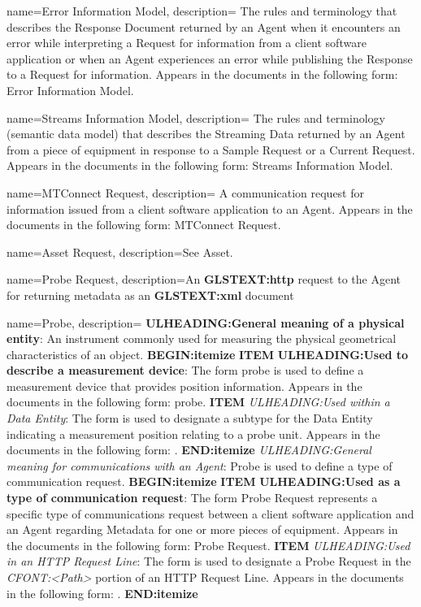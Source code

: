 {
    name={Error Information Model},
	description={
	The rules and terminology that describes the \gls{Response Document} returned by an \gls{Agent} when it encounters an error while interpreting a \gls{Request} for information from a client software application or when an \gls{Agent} experiences an error while publishing the \gls{Response} to a \gls{Request} for information.
	Appears in the documents in the following form: \gls{Error Information Model}.
}
}

{
    name={Streams Information Model},
	description={
	The rules and terminology (\gls{semantic data model}) that describes the \gls{Streaming Data} returned by an \gls{Agent} from a piece of equipment in response to a \gls{Sample Request} or a \gls{Current Request}.
	Appears in the documents in the following form: \gls{Streams Information Model}.
}
}

{
    name={MTConnect Request},
	description={
	A communication request for information issued from a client software application to an \gls{Agent}.
	Appears in the documents in the following form: \gls{MTConnect Request}.
}
}

{
    name={Asset Request},
	description={See \gls{Asset}.}
}

{
    name={Probe Request},
	description={An \textbf{GLSTEXT:http} request to the \gls{Agent} for returning metadata as an  \textbf{GLSTEXT:xml} document}
}

{
    name={Probe},
	description={
	\textbf{ULHEADING:General meaning of a physical entity}:
	An instrument commonly used for measuring the physical geometrical characteristics of an object.
    \textbf{BEGIN:itemize}
	\textbf{ITEM} \textbf{ULHEADING:Used to describe a measurement device}:
	The form probe is used to define a measurement device that provides position information.
	Appears in the documents in the following form: probe. 
	\textbf{ITEM} \textit{ULHEADING:Used within a \gls{Data Entity}}:
	The form  is used to designate a subtype for the \gls{Data Entity}  indicating a measurement position relating to a probe unit.
	Appears in the documents in the following form: .
    \textbf{END:itemize}
	\textit{ULHEADING:General meaning for communications with an \gls{Agent}}:
	Probe is used to define a type of communication request. 
    \textbf{BEGIN:itemize}
	\textbf{ITEM} \textbf{ULHEADING:Used as a type of communication request}:
	The form \gls{Probe Request} represents a specific type of communications request between a client software application and an \gls{Agent} regarding \gls{Metadata} for one or more pieces of equipment.
	Appears in the documents in the following form: \gls{Probe Request}.
	\textbf{ITEM} \textit{ULHEADING:Used in an \gls{HTTP Request Line}}:
	The form  is used to designate a \gls{Probe Request} in the \textit{CFONT:<Path>} portion of an \gls{HTTP Request Line}.
	Appears in the documents in the following form: .
    \textbf{END:itemize}
}
}

